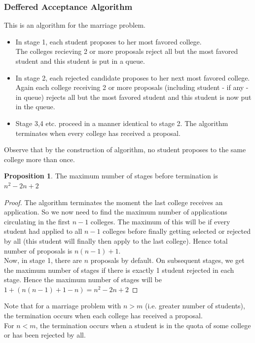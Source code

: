 \documentclass{article}
\theoremstyle{definition}
\newtheorem{prop}{Proposition}[section]
\begin{document}
\subsubsection*{Deffered Acceptance Algorithm}
This is an algorithm for the marriage problem.
\begin{itemize}
	\item In stage 1, each student proposes to her most favored college.\\
	The colleges recieving 2 or more proposals reject all but the most favored student and this student is put in a queue.
	\item  In stage 2, each rejected candidate proposes to her next most favored college.\\
	Again each college receiving 2 or more proposals (including student - if any - in queue) rejects all but the most favored student and this student is now put in the queue.
	\item Stage 3,4 etc. proceed in a manner identical to stage 2. The algorithm terminates when every college has received a proposal.
\end{itemize}
Observe that by the construction of algorithm, no student proposes to the same college more than once.
\begin{prop}
The maximum number of stages before termination is $n^2 - 2n + 2$
\end{prop}
\begin{proof}
The algorithm terminates the moment the last college receives an application. So we now need to find the maximum number of applications circulating in the first $n-1$ colleges. The maximum of this will be if every student had applied to all $n-1$ colleges before finally getting selected or rejected by all (this student will finally then apply to the last college). Hence total number of proposals is $n(n-1) + 1$.\\
Now, in stage 1, there are $n$ proposals by default. On subsequent stages, we get the maximum number of stages if there is exactly 1 student rejected in each stage. Hence the maximum number of stages will be $1 + (n(n-1) + 1 - n) = n^2 - 2n + 2$
\end{proof}
Note that for a marriage problem with $n>m$ (i.e. greater number of students), the termination occurs when each college has received a proposal.\\
For $n<m$, the termination occurs when a student is in the quota of some college or has been rejected by all.
\end{document}
